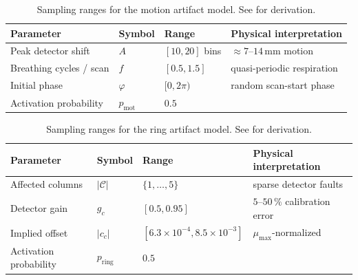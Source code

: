 \begin{table}[!htb]
    \centering
    \caption[Motion artifact parameters (reproduced from ).]{%
        Sampling ranges for the motion artifact model. See  for derivation.}
    \label{tab:app_motion_params}
    \begin{tabular}{llll}
        \toprule
        Parameter & Symbol & Range & Physical interpretation \\
        \midrule
        Peak detector shift     & $A$            & $[10,20]$ bins & $\approx7$--$14\,\text{mm}$ motion \\
        Breathing cycles / scan & $f$            & $[0.5,1.5]$    & quasi-periodic respiration \\
        Initial phase           & $\varphi$      & $[0,2\pi)$     & random scan-start phase \\
        Activation probability  & $p_\text{mot}$ & $0.5$          & \\
        \bottomrule
    \end{tabular}
\end{table}

\begin{table}[!htb]
    \centering
    \caption[Ring artifact parameters (reproduced from ).]{%
        Sampling ranges for the ring artifact model. See  for derivation.}
    \label{tab:app_ring_params}
    \begin{tabular}{llll}
        \toprule
        Parameter & Symbol & Range & Physical interpretation \\
        \midrule
        Affected columns        & $|\mathcal{C}|$ & $\{1,\dots,5\}$  & sparse detector faults \\
        Detector gain           & $g_c$           & $[0.5,0.95]$     & $5$--$50\,\%$ calibration error \\
        Implied offset          & $|c_c|$         & $[6.3\times10^{-4},8.5\times10^{-3}]$ & $\mu_{\max}$-normalized \\
        Activation probability  & $p_\text{ring}$ & $0.5$            & \\
        \bottomrule
    \end{tabular}
\end{table}

